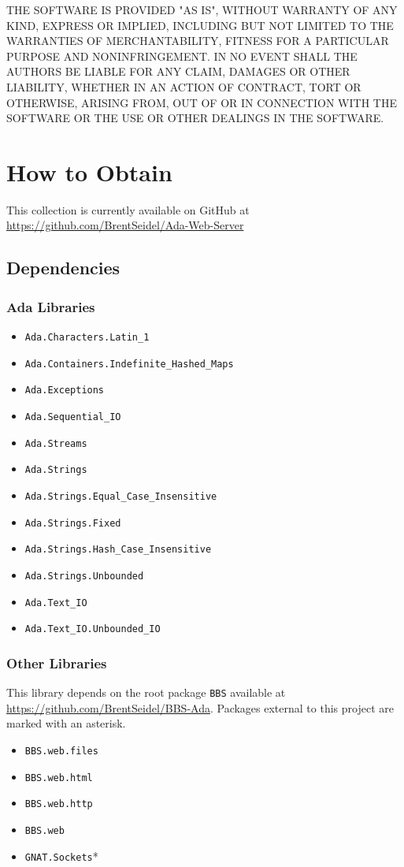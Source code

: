 \documentclass[10pt, openany]{book}
\newcommand{\package}[1]{\texttt{#1}}
\begin{document}
THE SOFTWARE IS PROVIDED "AS IS", WITHOUT WARRANTY OF ANY KIND, EXPRESS OR IMPLIED, INCLUDING BUT NOT LIMITED TO THE WARRANTIES OF MERCHANTABILITY, FITNESS FOR A PARTICULAR PURPOSE AND NONINFRINGEMENT. IN NO EVENT SHALL THE AUTHORS BE LIABLE FOR ANY CLAIM, DAMAGES OR OTHER LIABILITY, WHETHER IN AN ACTION OF CONTRACT, TORT OR OTHERWISE, ARISING FROM, OUT OF OR IN CONNECTION WITH THE SOFTWARE OR THE USE OR OTHER DEALINGS IN THE SOFTWARE.

\chapter{How to Obtain}
This collection is currently available on GitHub at \url{https://github.com/BrentSeidel/Ada-Web-Server}

\section{Dependencies}
\subsection{Ada Libraries}
\begin{itemize}
  \item \package{Ada.Characters.Latin\_1}
  \item \package{Ada.Containers.Indefinite\_Hashed\_Maps}
  \item \package{Ada.Exceptions}
  \item \package{Ada.Sequential\_IO}
  \item \package{Ada.Streams}
  \item \package{Ada.Strings}
  \item \package{Ada.Strings.Equal\_Case\_Insensitive}
  \item \package{Ada.Strings.Fixed}
  \item \package{Ada.Strings.Hash\_Case\_Insensitive}
  \item \package{Ada.Strings.Unbounded}
  \item \package{Ada.Text\_IO}
  \item \package{Ada.Text\_IO.Unbounded\_IO}
\end{itemize}

\subsection{Other Libraries}
This library depends on the root package \package{BBS} available at \url{https://github.com/BrentSeidel/BBS-Ada}.  Packages external to this project are marked with an asterisk.
\begin{itemize}
  \item \package{BBS.web.files}
  \item \package{BBS.web.html}
  \item \package{BBS.web.http}
  \item \package{BBS.web}
  \item \package{GNAT.Sockets}*
\end{itemize}
\end{document}
